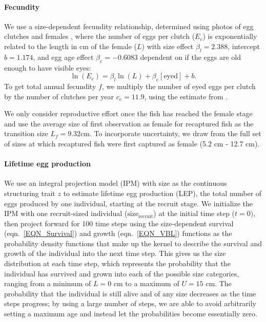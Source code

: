 \documentclass[12pt, oneside]{article}   	%
\begin{document}
\paragraph*{Fecundity}

We use a size-dependent fecundity relationship, determined using photos of egg clutches and females \citep{yawdoszynInPrepfecundity}, where the number of eggs per clutch ($E_c$) is exponentially related to the length in cm of the female ($L$) with size effect $\beta_l = 2.388$, intercept $b = 1.174$, and egg age effect $\beta_e = -0.6083$ dependent on if the eggs are old enough to have visible eyes: 
\begin{equation} %
\ln(E_c) = \beta_l\ln(L) + \beta_e[\text{eyed}] + b. \label{EQN_Fec}
\end{equation}
To get total annual fecundity $f$, we multiply the number of eyed eggs per clutch by the number of clutches per year $c_e = 11.9$, using the estimate from \cite{holtswarth2017fecundity}.

We only consider reproductive effort once the fish has reached the female stage and use the average size of first observation as female for recaptured fish as the transition size $L_f = 9.32 \text{cm}$. To incorporate uncertainty, we draw from the full set of sizes at which recaptured fish were first captured as female (5.2 cm - 12.7 cm).


\paragraph*{Lifetime egg production}
We use an integral projection model (IPM) \citep[e.g.][]{rees2014building} with size as the continuous structuring trait $z$ to estimate lifetime egg production (LEP), the total number of eggs produced by one individual, starting at the recruit stage. We initialize the IPM with one recruit-sized individual ($\text{size}_\text{recruit}$) at the initial time step ($t=0$), then project forward for 100 time steps using the size-dependent survival (eqn.\ \ref{EQN_Survival}) and growth (eqn.\ \ref{EQN_VBL}) functions as the probability density functions that make up the kernel to describe the survival and growth of the individual into the next time step. This gives us the size distribution at each time step, which represents the probability that the individual has survived and grown into each of the possible size categories, ranging from a minimum of $L=0$ cm to a maximum of $U=15$ cm. The probability that the individual is still alive and of any size decreases as the time steps progress; by using a large number of steps, we are able to avoid arbitrarily setting a maximum age and instead let the probabilities become essentially zero. 
\end{document}
